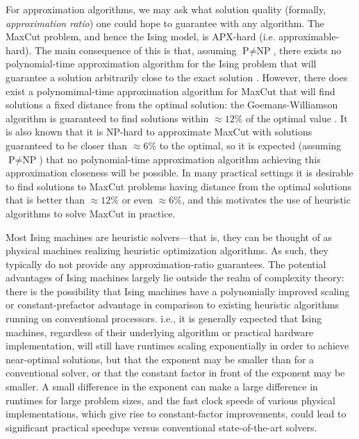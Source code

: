 \documentclass[fleqn,10pt]{wlscirep}
\begin{document}
For approximation algorithms, we may ask what solution quality (formally, \textit{approximation ratio}) one could hope to guarantee with any algorithm. The MaxCut problem, and hence the Ising model, is APX-hard (i.e. approximable-hard). The main consequence of this is that, assuming  $ \text{P} \ne  \text{NP} $, there exists no polynomial-time approximation algorithm for the Ising problem that will guarantee a solution arbitrarily close to the exact solution \cite{papadimitriou1991optimization}. However, there does exist a polynomimal-time approximation algorithm for MaxCut that will find solutions a fixed distance from the optimal solution: the Goemans-Williamson algorithm is guaranteed to find solutions within $ \approx 12 \%$ of the optimal value \cite{goemans1995improved}. It is also known that it is NP-hard to approximate MaxCut with solutions guaranteed to be closer than $ \approx 6 \%$ to the optimal\cite{haastad2001some}, so it is expected (assuming $ \text{P} \ne  \text{NP} $) that no polynomial-time approximation algorithm achieving this approximation closeness will be possible. In many practical settings it is desirable to find solutions to MaxCut problems having distance from the optimal solutions that is better than $ \approx 12 \%$ or even $ \approx 6 \%$, and this motivates the use of heuristic algorithms to solve MaxCut in practice.%


Most Ising machines are heuristic solvers---that is, they can be thought of as physical machines realizing heuristic optimization algorithms. As such, they typically do not provide any approximation-ratio guarantees. The potential advantages of Ising machines largely lie outside the realm of complexity theory: there is the possibility that Ising machines have a polynomially improved scaling or constant-prefactor advantage in comparison to existing heuristic algorithms running on conventional processors. i.e., it is generally expected that Ising machines, regardless of their underlying algorithm or practical hardware implementation, will still have runtimes scaling exponentially in order to achieve near-optimal solutions, but that the exponent may be smaller than for a conventional solver, or that the constant factor in front of the exponent may be smaller. A small difference in the exponent can make a large difference in runtimes for large problem sizes, and the fast clock speeds of various physical implementations, which give rise to constant-factor improvements, could lead to significant practical speedups versus conventional state-of-the-art solvers. %
\end{document}

